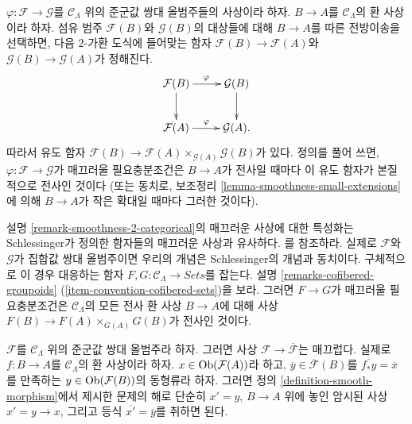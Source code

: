 \begin{remark}
\label{remark-smoothness-2-categorical}
$\varphi : \mathcal{F} \to \mathcal{G}$를 $\mathcal{C}_\Lambda$ 위의
준군값 쌍대 올범주들의 사상이라 하자. $B \to A$를
$\mathcal{C}_\Lambda$의 환 사상이라 하자. 섬유 범주
$\mathcal{F}(B)$와 $\mathcal{G}(B)$의 대상들에 대해 $B \to A$를 따른
전방이송을 선택하면, 다음 $2$-가환 도식에 들어맞는 함자
$\mathcal{F}(B) \to \mathcal{F}(A)$와
$\mathcal{G}(B) \to \mathcal{G}(A)$가 정해진다.
$$
\xymatrix{
\mathcal{F}(B) \ar[r]^{\varphi} \ar[d] & \mathcal{G}(B) \ar[d] \\
\mathcal{F}(A) \ar[r]^{\varphi}        & \mathcal{G}(A) .
}
$$
따라서 유도 함자 $\mathcal{F}(B) \to \mathcal{F}(A)
\times_{\mathcal{G}(A)} \mathcal{G}(B)$가 있다. 정의를 풀어 쓰면,
$\varphi : \mathcal{F} \to \mathcal{G}$가 매끄러울 필요충분조건은
$B \to A$가 전사일 때마다 이 유도 함자가 본질적으로 전사인 것이다
(또는 동치로, 보조정리 \ref{lemma-smoothness-small-extensions}에 의해
$B \to A$가 작은 확대일 때마다 그러한 것이다).
\end{remark}

\begin{remark}
\label{remark-compare-smooth-schlessinger}
설명 \ref{remark-smoothness-2-categorical}의 매끄러운 사상에 대한
특성화는 Schlessinger가 정의한 함자들의 매끄러운 사상과 유사하다.
\cite[Definition 2.2.]{Sch}를 참조하라. 실제로 $\mathcal{F}$와
$\mathcal{G}$가 집합값 쌍대 올범주이면 우리의 개념은 Schlessinger의
개념과 동치이다. 구체적으로 이 경우 대응하는 함자
$F, G : \mathcal{C}_\Lambda \to \textit{Sets}$를 잡는다. 설명
\ref{remarks-cofibered-groupoids}
(\ref{item-convention-cofibered-sets})을 보라. 그러면 $F \to G$가
매끄러울 필요충분조건은 $\mathcal{C}_\Lambda$의 모든 전사 환 사상
$B \to A$에 대해 사상 $F(B) \to F(A) \times_{G(A)} G(B)$가
전사인 것이다.
\end{remark}

\begin{remark}
\label{remark-smooth-to-iso-classes}
$\mathcal{F}$를 $\mathcal{C}_\Lambda$ 위의 준군값 쌍대
올범주라 하자. 그러면 사상
$\mathcal{F} \to \overline{\mathcal{F}}$는 매끄럽다. 실제로
$f : B \to A$를 $\mathcal{C}_\Lambda$의 환 사상이라 하자.
$x \in \mathop{\mathrm{Ob}}\nolimits(\mathcal{F}(A))$라 하고,
$\overline{y} \in \overline{\mathcal{F}}(B)$를
$\overline{f_*y} = \overline{x}$를 만족하는
$y \in \mathop{\mathrm{Ob}}\nolimits(\mathcal{F}(B))$의 동형류라 하자. 그러면 정의
\ref{definition-smooth-morphism}에서 제시한 문제의 해로 단순히
$x' = y$, $B \to A$ 위에 놓인 암시된 사상 $x' = y \to x$, 그리고
등식 $\overline{x'} = \overline{y}$를 취하면 된다.
\end{remark}

